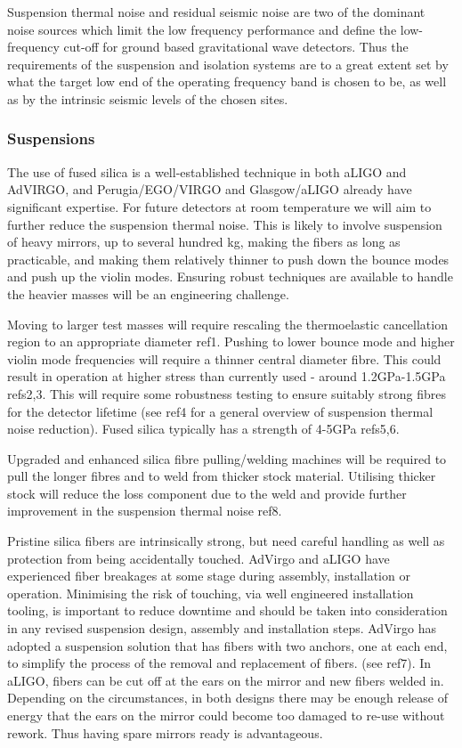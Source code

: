 Suspension thermal noise and residual seismic noise are two of the dominant noise sources which limit the low frequency performance and define the low-frequency cut-off for ground based gravitational wave detectors. Thus the requirements of the suspension and isolation systems are to a great extent set by what the target low end of the operating frequency band is chosen to be, as well as by the intrinsic seismic levels of the chosen sites.

\subsubsection{Suspensions}

The use of fused silica is a well-established technique in both aLIGO and AdVIRGO,  and Perugia/EGO/VIRGO and Glasgow/aLIGO already have significant expertise. For future detectors at room temperature  we will aim to further reduce the suspension thermal noise. This is likely to involve suspension of heavy mirrors, up to several hundred kg, making the fibers as long as practicable, and making them relatively thinner to push down the bounce modes and push up the violin modes.  Ensuring robust techniques are available to handle the heavier masses will be an engineering challenge.
 
Moving to larger test masses will require rescaling the thermoelastic cancellation region to an appropriate diameter ref1. Pushing to lower bounce mode and higher violin mode frequencies will require a thinner central diameter fibre. This could result in operation at higher stress than currently used - around 1.2GPa-1.5GPa refs2,3. This will require some robustness testing to ensure suitably strong fibres for the detector lifetime (see ref4 for a general overview of suspension thermal noise reduction). Fused silica typically has a strength of 4-5GPa refs5,6.

Upgraded and enhanced silica fibre pulling/welding machines will be required to  pull the longer fibres and to weld from thicker stock material. Utilising thicker stock will reduce the loss component due to the weld and provide further improvement in the suspension thermal noise ref8. 

Pristine silica fibers are intrinsically strong, but need careful handling as well as protection from being accidentally touched. AdVirgo and aLIGO have experienced fiber breakages at some stage during assembly, installation or operation. Minimising the risk of touching, via well engineered installation tooling, is important to reduce downtime and should be taken into consideration in any revised suspension design, assembly and installation steps. AdVirgo has adopted a suspension solution that has fibers with two anchors, one at each end, to simplify the process of the removal and replacement of fibers. (see ref7). In aLIGO, fibers can be cut off at the ears on the mirror and new fibers welded in. Depending on the circumstances, in both designs there may be enough release of energy that the ears on the mirror could become too damaged to re-use without rework. Thus having spare mirrors ready is advantageous. 

